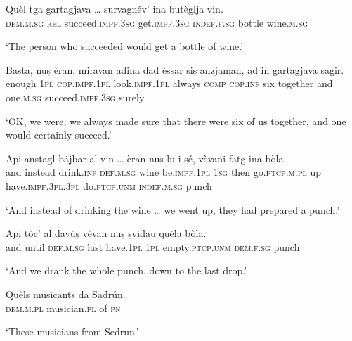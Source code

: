 \begin{linenumbers}
\gll    Quèl tga gartagjava … survagnév’ ina butèglja vin.\\
\textsc{dem.m.sg} \textsc{rel} succeed.\textsc{impf.3sg} {} get.\textsc{impf.3sg} \textsc{indef.f.sg} bottle wine.\textsc{m.sg}\\
\end{linenumbers}
\medskip
\glt `The person who succeeded would get a bottle of wine.'
\medskip

\begin{linenumbers}
	\gll  Basta, nuṣ èran, miravan adina dad èssar siṣ anzjaman, ad in gartagjava sagir.\\
	enough \textsc{1pl} \textsc{cop.impf.1pl} look.\textsc{impf.1pl} always \textsc{comp}  \textsc{cop.inf} six together and one.\textsc{m.sg} succeed.\textsc{impf.3sg} surely \\
\end{linenumbers}
\medskip
\glt `OK, we were, we always made sure that there were six of us together, and one would certainly succeed.'
\medskip

\begin{linenumbers}
	\gll    Api anstagl bájbar al vin … èran nus lu i sé, vèvani fatg ina bòla.\\
	and instead drink.\textsc{inf} \textsc{def.m.sg} wine {} be.\textsc{impf.1pl} \textsc{1sg} then go.\textsc{ptcp.m.pl} up have.\textsc{impf.3pl.3pl} do.\textsc{ptcp.unm} \textsc{indef.m.sg} punch \\
\end{linenumbers}
\medskip
\glt `And instead of drinking the wine … we went up, they had prepared a punch.'
\medskip

\begin{linenumbers}
	\gll    Api tòc’ al davùṣ vèvan nuṣ ṣvidau quèla bòla.\\
	and until \textsc{def.m.sg} last have.\textsc{1pl} \textsc{1pl} empty.\textsc{ptcp.unm} \textsc{dem.f.sg} punch \\
\end{linenumbers}
\medskip
\glt `And we drank the whole punch, down to the last drop.'
\medskip

\begin{linenumbers}
\gll    Quèls musicants da Sadrún.\\
\textsc{dem.m.pl} musician.\textsc{pl} of \textsc{pn}\\
\end{linenumbers}
\medskip 
\glt `These musicians from Sedrun.'
\medskip


